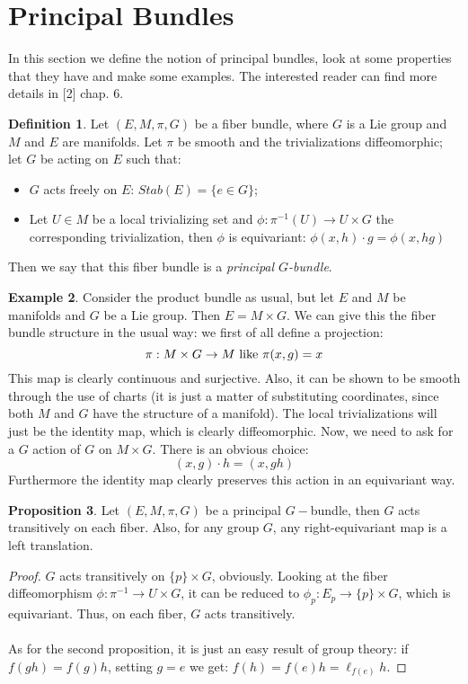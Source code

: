 \documentclass[12pt,a4paper]{report}
\theoremstyle{definition}
\newtheorem{Def}{Definition}[chapter]
\theoremstyle{Theorem}
\newtheorem{Prop}[Def]{Proposition}
\theoremstyle{definition}
\newtheorem{Ex}[Def]{Example}
\theoremstyle{definition}
\begin{document}
	\section{Principal Bundles}
	In this section we define the notion of principal bundles, look at some properties that they have and make some examples. The interested reader can find more details in [2] chap. 6.
	\begin{Def}
		Let $(E,M,\pi,G)$ be a fiber bundle, where $G$ is a Lie group and $M$ and $E$ are manifolds. Let $\pi$ be smooth and the trivializations diffeomorphic; let $G$ be acting on $E$ such that:
		\begin{itemize}
			\item $G$ acts freely on $E$: $Stab(E)=\{e\in G\}$;
			\item Let $U\in M$ be a local trivializing set and $\phi:\pi^{-1}(U)\rightarrow U\times G$  the corresponding trivialization, then $\phi$ is equivariant: $\phi(x,h)\cdot g=\phi(x,hg)$
		\end{itemize} 
		Then we say that this fiber bundle is a \textit{principal $G$-bundle}.
	\end{Def}
	\begin{Ex}
		Consider the product bundle as usual, but let $E$ and $M$ be manifolds and $G$ be a Lie group. Then $E=M\times G$. We can give this the fiber bundle structure in the usual way: we first of all define a projection:
		$$\pi:M\times G\rightarrow M\hbox{ like }\pi(x,g)=x$$
		This map is clearly continuous and surjective. Also, it can be shown to be smooth through the use of charts (it is just a matter of substituting coordinates, since both $M$ and $G$ have the structure of a manifold). The local trivializations will just be the identity map, which is clearly diffeomorphic. Now, we need to ask for a $G$ action of $G$ on $M\times G$. There is an obvious choice:
		$$(x,g)\cdot h=(x,gh)$$
		Furthermore the identity map clearly preserves this action in an equivariant way.
	\end{Ex}
	\begin{Prop} \label{Prop_3.5.1}
		Let $(E,M,\pi,G)$ be a principal $G-$bundle, then $G$ acts transitively on each fiber. Also, for any group $G$, any right-equivariant map is a left translation.
	\end{Prop}
	\begin{proof}
		$G$ acts transitively on $\{p\} \times G$, obviously. Looking at the fiber diffeomorphism $\phi:\pi^{-1}\rightarrow U\times G$, it can be reduced to $\phi_p:E_p\rightarrow \{p\}\times G$, which is equivariant. Thus, on each fiber, $G$ acts transitively.\\
		\\
		As for the second proposition, it is just an easy result of group theory: if $f(gh)=f(g)h$, setting $g=e$ we get: $f(h)=f(e)h=\ell_{f(e)}h$.
	\end{proof}
\end{document}
